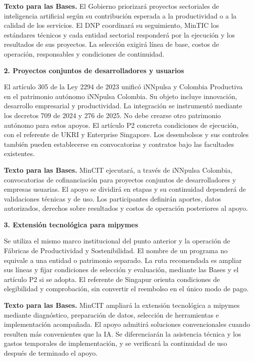\textbf{Texto para las Bases.} El Gobierno priorizará proyectos sectoriales de inteligencia artificial según su contribución esperada a la productividad o a la calidad de los servicios. El DNP coordinará su seguimiento, MinTIC los estándares técnicos y cada entidad sectorial responderá por la ejecución y los resultados de sus proyectos. La selección exigirá línea de base, costos de operación, responsables y condiciones de continuidad.

\textbf{2. Proyectos conjuntos de desarrolladores y usuarios}\par\nobreak

El artículo 305 de la Ley 2294 de 2023 unificó iNNpulsa y Colombia Productiva en el patrimonio autónomo iNNpulsa Colombia. Su objeto incluye innovación, desarrollo empresarial y productividad. La integración se instrumentó mediante los decretos 709 de 2024 y 276 de 2025. No debe crearse otro patrimonio autónomo para estos apoyos. El artículo P2 concreta condiciones de ejecución, con el referente de UKRI y Enterprise Singapore. Los desembolsos y sus controles también pueden establecerse en convocatorias y contratos bajo las facultades existentes.

\textbf{Texto para las Bases.} MinCIT ejecutará, a través de iNNpulsa Colombia, convocatorias de cofinanciación para proyectos conjuntos de desarrolladores y empresas usuarias. El apoyo se dividirá en etapas y su continuidad dependerá de validaciones técnicas y de uso. Los participantes definirán aportes, datos autorizados, derechos sobre resultados y costos de operación posteriores al apoyo.

\textbf{3. Extensión tecnológica para mipymes}\par\nobreak

Se utiliza el mismo marco institucional del punto anterior y la operación de Fábricas de Productividad y Sostenibilidad. El nombre de un programa no equivale a una entidad o patrimonio separado. La ruta recomendada es ampliar sus líneas y fijar condiciones de selección y evaluación, mediante las Bases y el artículo P2 si se adopta. El referente de Singapur orienta condiciones de elegibilidad y comprobación, sin convertir el reembolso en el único modo de pago.

\textbf{Texto para las Bases.} MinCIT ampliará la extensión tecnológica a mipymes mediante diagnóstico, preparación de datos, selección de herramientas e implementación acompañada. El apoyo admitirá soluciones convencionales cuando resulten más convenientes que la IA. Se diferenciarán la asistencia técnica y los gastos temporales de implementación, y se verificará la continuidad de uso después de terminado el apoyo.

